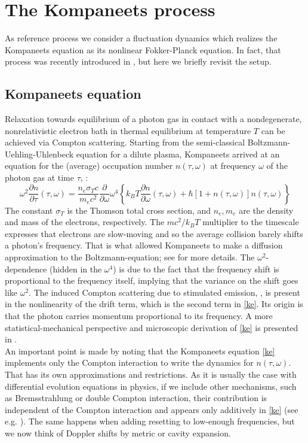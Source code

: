 \documentclass[a4paper,12pt,reqno,superscriptaddress,nofootinbib]{revtex4}
\theoremstyle{plain}
\theoremstyle{definition}
\theoremstyle{remark}
\newcommand{\0}{^{(0)}}
\newcommand{\1}{^{(1)}}
\newcommand{\2}{^{(2)}}
\begin{document}
\section{The Kompaneets process}

As reference process we consider a fluctuation dynamics which realizes the Kompaneets equation as its nonlinear Fokker-Planck equation. In fact, that process was recently introduced in \cite{paper2}, but here we briefly revisit the setup.

\subsection{Kompaneets equation}
Relaxation towards equilibrium of a photon gas in contact with a nondegenerate, nonrelativistic electron bath in thermal equilibrium at temperature $T$ can be achieved via Compton scattering. Starting from the semi-classical Boltzmann-Uehling-Uhlenbeck equation for a dilute plasma, Kompaneets arrived at an equation for the (average) occupation number $n(\tau,\omega)$ at frequency $\omega$ of the photon gas at time $\tau$, \cite{kompa}:
\begin{equation}\label{ke}
\omega^2\frac{\partial n}{\partial \tau}(\tau,\omega)= \frac{n_e\sigma_T 
	c}{m_e c^2}\frac{\partial }{\partial \omega}\omega^4\left\{k_B T 
\frac{\partial n}{\partial \omega}(\tau,\omega) + 
\hbar\left[1+n(\tau,\omega)\right]n(\tau,\omega)\right\}
\end{equation}
The constant $\sigma_T$ is the Thomson total cross section, and $n_e,m_e$ are  the density and mass of the electrons, respectively.
The $ mc^2 / k_BT$ multiplier to the timescale expresses that electrons are slow-moving and so the average collision barely shifts a photon's frequency.  That is what allowed Kompaneets to make a diffusion approximation to the Boltzmann-equation; see \cite{paper} for more details.  The $\omega^2$- dependence (hidden in the $\omega^4$)  is due to the fact that the frequency shift is proportional to the frequency itself, implying that the variance on the shift goes like $\omega^2$. 
The induced Compton scattering due to stimulated emission, \cite{liedahl, blandford}, is present in the nonlinearity of the drift term, which is the second term in \eqref{ke}.  Its origin is that the photon carries momentum  proportional to its frequency.  A more statistical-mechanical perspective and microscopic derivation of  \eqref{ke} is presented in \cite{paper}.\\

An important point is made by noting that the Kompaneets equation \eqref{ke} implements only the Compton interaction to write the dynamics for $n(\tau,\omega)$. That has its own approximations and restrictions. As it is usually the case with differential evolution equations in physics, if we include other mechanisms, such as Bremsstrahlung or double Compton interaction, their contribution is independent of the Compton interaction and appears only additively in \eqref{ke} (see e.g. \cite{kompa, lightman}). The same happens when adding resetting to low-enough frequencies, but we now think of Doppler shifts by metric or cavity expansion.\\
\end{document}

